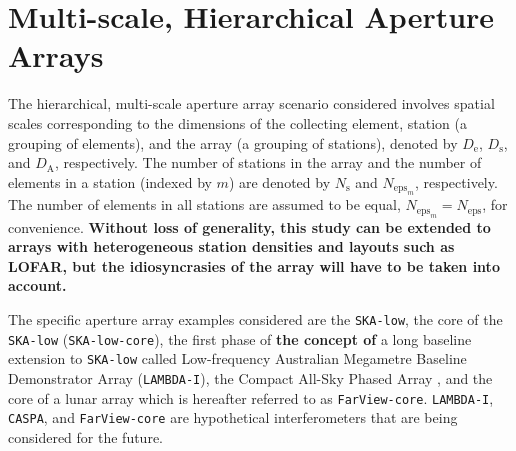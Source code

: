 \documentclass[
  journal=pasa,
  manuscript=article-type,
  year=2020,
  volume=37,
]{cup-journal}
\begin{document}
\section{Multi-scale, Hierarchical Aperture Arrays} \label{sec:multi-scale-arrays}

The hierarchical, multi-scale aperture array scenario considered involves spatial scales corresponding to the dimensions of the collecting element, station (a grouping of elements), and the array (a grouping of stations), denoted by $D_\textrm{e}$, $D_\textrm{s}$, and $D_\textrm{A}$, respectively. The number of stations in the array and the number of elements in a station (indexed by $m$) are denoted by $N_\textrm{s}$ and $N_{\textrm{eps}_m}$, respectively. The number of elements in all stations are assumed to be equal, $N_{\textrm{eps}_m} = N_\textrm{eps}$, for convenience. \textbf{Without loss of generality, this study can be extended to arrays with heterogeneous station densities and layouts such as LOFAR, but the idiosyncrasies of the array will have to be taken into account.}

The specific aperture array examples considered are the \texttt{SKA-low}, the core of the \texttt{SKA-low} (\texttt{SKA-low-core}), the first phase of \textbf{the concept of} a long baseline extension to \texttt{SKA-low} called Low-frequency Australian Megametre Baseline Demonstrator Array (\texttt{LAMBDA-I}), the Compact All-Sky Phased Array \citep[\texttt{CASPA}\footnote{CASPA's stations are intnded for localisation and astrometry, rather than for aperture synthesis.};][]{Luo+2024}, and the core of a lunar array \citep[\texttt{FarView};][]{Polidan+2024} which is hereafter referred to as \texttt{FarView-core}. \texttt{LAMBDA-I}, \texttt{CASPA}, and \texttt{FarView-core} are hypothetical interferometers that are being considered for the future. 
\end{document}
